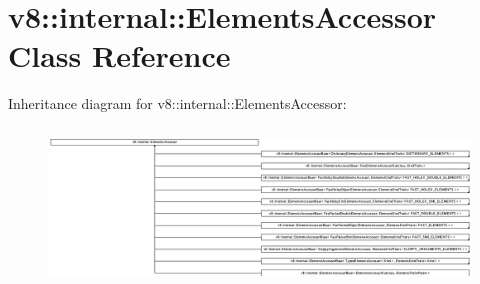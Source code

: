 \hypertarget{classv8_1_1internal_1_1_elements_accessor}{}\section{v8\+:\+:internal\+:\+:Elements\+Accessor Class Reference}
\label{classv8_1_1internal_1_1_elements_accessor}
Inheritance diagram for v8\+:\+:internal\+:\+:Elements\+Accessor\+:\begin{figure}[H]
\begin{center}
\leavevmode
\includegraphics[height=4.221106cm]{classv8_1_1internal_1_1_elements_accessor}
\end{center}
\end{figure}
